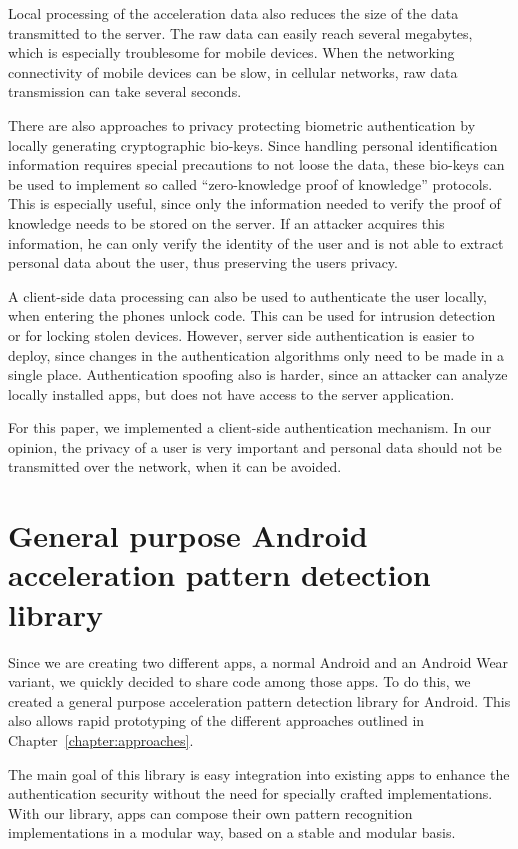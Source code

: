 Local processing of the acceleration data also reduces the size of the data transmitted to the server. The raw data can easily reach several megabytes, which is especially troublesome for mobile devices. When the networking connectivity of mobile devices can be slow, \eg in cellular networks, raw data transmission can take several seconds.

There are also approaches to privacy protecting biometric authentication by locally generating cryptographic bio-keys\cite{bhargav2006privacy, verbitskiy2003reliable, ross2011visual}. Since handling personal identification information requires special precautions to not loose the data, these bio-keys can be used to implement so called ``zero-knowledge proof of knowledge'' protocols. This is especially useful, since only the information needed to verify the proof of knowledge needs to be stored on the server. If an attacker acquires this information, he can only verify the identity of the user and is not able to extract personal data about the user, thus preserving the users privacy.

A client-side data processing can also be used to authenticate the user locally, \eg when entering the phones unlock code. This can be used for intrusion detection or for locking stolen devices. However, server side authentication is easier to deploy, since changes in the authentication algorithms only need to be made in a single place. Authentication spoofing also is harder, since an attacker can analyze locally installed apps, but does not have access to the server application.

For this paper, we implemented a client-side authentication mechanism. In our opinion, the privacy of a user is very important and personal data should not be transmitted over the network, when it can be avoided.

\section{General purpose Android acceleration pattern detection library}
Since we are creating two different apps, a normal Android and an Android Wear variant, we quickly decided to share code among those apps. To do this, we created a general purpose acceleration pattern detection library for Android. This also allows rapid prototyping of the different approaches outlined in Chapter~\ref{chapter:approaches}.

The main goal of this library is easy integration into existing apps to enhance the authentication security without the need for specially crafted implementations. With our library, apps can compose their own pattern recognition implementations in a modular way, based on a stable and modular basis.

